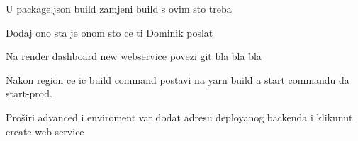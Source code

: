 			 U package.json build zamjeni build s ovim sto treba
			 
			 Dodaj ono sta je onom sto ce ti Dominik poslat
			 
			 Na render dashboard new webservice povezi git bla bla bla
			 
			 Nakon region ce ic build command postavi na yarn build a start commandu da start-prod. 
			 
			 Proširi advanced i enviroment var dodat adresu deployanog backenda i klikunut create web service
			 
			 
			 
			 
			 	
			 		
			
			
			\eject 